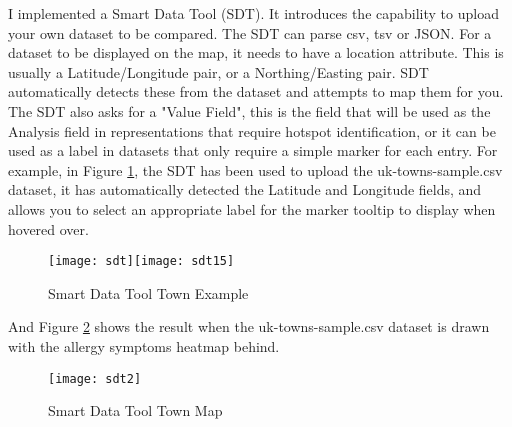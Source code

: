 I implemented a Smart Data Tool (SDT). It introduces the capability to upload your own dataset to be compared. The SDT can parse csv, tsv or JSON. For a dataset to be displayed on the map, it needs to have a location attribute. This is usually a Latitude/Longitude pair, or a Northing/Easting pair. SDT automatically detects these from the dataset and attempts to map them for you.\\

The SDT also asks for a "Value Field", this is the field that will be used as the Analysis field in representations that require hotspot identification, or it can be used as a label in datasets that only require a simple marker for each entry. For example, in Figure \ref{fig:sdt}, the SDT has been used to upload the uk-towns-sample.csv dataset, it has automatically detected the Latitude and Longitude fields, and allows you to select an appropriate label for the marker tooltip to display when hovered over.\\

\begin{figure}[H]
\begin{center}
\texttt{[image: sdt]}\texttt{[image: sdt15]}
\caption{Smart Data Tool Town Example}
\label{fig:sdt}
\end{center}
\end{figure}

And Figure \ref{fig:sdt2} shows the result when the uk-towns-sample.csv dataset is drawn with the allergy symptoms heatmap behind.

\begin{figure}[H]
\begin{center}
\texttt{[image: sdt2]}
\caption{Smart Data Tool Town Map}
\label{fig:sdt2}
\end{center}
\end{figure}
